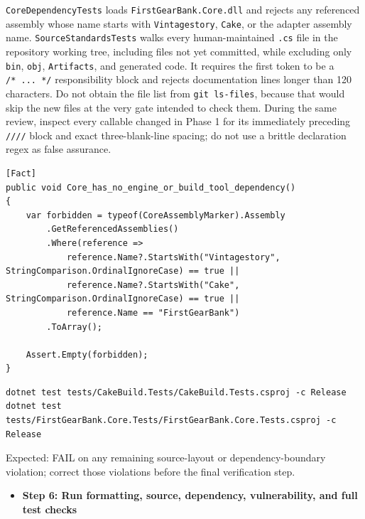\documentclass[
  10pt,
  letterpaper,
]{article}
\newcommand{\passthrough}[1]{#1}
\providecommand{\tightlist}{%
  \setlength{\itemsep}{0pt}\setlength{\parskip}{0pt}}
\begin{document}
\passthrough{\lstinline!CoreDependencyTests!} loads
\passthrough{\lstinline!FirstGearBank.Core.dll!} and rejects any
referenced assembly whose name starts with
\passthrough{\lstinline!Vintagestory!}, \passthrough{\lstinline!Cake!},
or the adapter assembly name.
\passthrough{\lstinline!SourceStandardsTests!} walks every
human-maintained \passthrough{\lstinline!.cs!} file in the repository
working tree, including files not yet committed, while excluding only
\passthrough{\lstinline!bin!}, \passthrough{\lstinline!obj!},
\passthrough{\lstinline!Artifacts!}, and generated code. It requires the
first token to be a
\texttt{/}\allowbreak{}\texttt{*\ }\allowbreak{}\texttt{.}\allowbreak{}\texttt{.}\allowbreak{}\texttt{.}\allowbreak{}\texttt{\ }\allowbreak{}\texttt{*/}\allowbreak{}
responsibility block and rejects documentation lines longer than 120
characters. Do not obtain the file list from
\passthrough{\lstinline!git ls-files!}, because that would skip the new
files at the very gate intended to check them. During the same review,
inspect every callable changed in Phase 1 for its immediately preceding
\texttt{/}\allowbreak{}\texttt{/}\allowbreak{}\texttt{/}\allowbreak{}\texttt{/}\allowbreak{}
block and exact three-blank-line spacing; do not use a brittle
declaration regex as false assurance.

\begin{lstlisting}
[Fact]
public void Core_has_no_engine_or_build_tool_dependency()
{
    var forbidden = typeof(CoreAssemblyMarker).Assembly
        .GetReferencedAssemblies()
        .Where(reference =>
            reference.Name?.StartsWith("Vintagestory", StringComparison.OrdinalIgnoreCase) == true ||
            reference.Name?.StartsWith("Cake", StringComparison.OrdinalIgnoreCase) == true ||
            reference.Name == "FirstGearBank")
        .ToArray();

    Assert.Empty(forbidden);
}
\end{lstlisting}

\begin{lstlisting}
dotnet test tests/CakeBuild.Tests/CakeBuild.Tests.csproj -c Release
dotnet test tests/FirstGearBank.Core.Tests/FirstGearBank.Core.Tests.csproj -c Release
\end{lstlisting}

Expected: FAIL on any remaining source-layout or dependency-boundary
violation; correct those violations before the final verification step.

\begin{itemize}
\tightlist
\item[$\square$]
  \textbf{Step 6: Run formatting, source, dependency, vulnerability, and
  full test checks}
\end{itemize}
\end{document}
